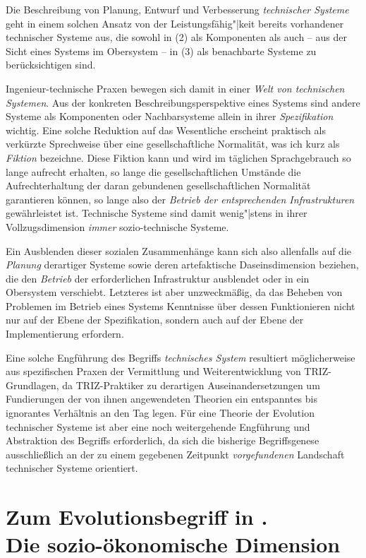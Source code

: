 \documentclass[11pt,a4paper]{article}
\begin{document}
Die Beschreibung von Planung, Entwurf und Verbesserung \emph{technischer
  Systeme} geht in einem solchen Ansatz von der Leistungsfähig"|keit bereits
vorhandener technischer Systeme aus, die sowohl in (2) als Komponenten als
auch -- aus der Sicht eines Systems im Obersystem -- in (3) als benachbarte
Systeme zu berücksichtigen sind.

Ingenieur-technische Praxen bewegen sich damit in einer \emph{Welt von
  technischen Systemen}. Aus der konkreten Beschreibungsperspektive eines
Systems sind andere Systeme als Komponenten oder Nachbarsysteme allein in
ihrer \emph{Spezifikation} wichtig. Eine solche Reduktion auf das Wesentliche
erscheint praktisch als verkürzte Sprechweise über eine gesellschaftliche
Normalität, was ich kurz als \emph{Fiktion} bezeichne.  Diese Fiktion kann und
wird im täglichen Sprachgebrauch so lange aufrecht erhalten, so lange die
gesellschaftlichen Umstände die Aufrechterhaltung der daran gebundenen
gesellschaftlichen Normalität garantieren können, so lange also der
\emph{Betrieb der entsprechenden Infrastrukturen} gewährleistet ist.
Technische Systeme sind damit wenig"|stens in ihrer Vollzugsdimension
\emph{immer} sozio-technische Systeme.

Ein Ausblenden dieser sozialen Zusammenhänge kann sich also allenfalls auf die
\emph{Planung} derartiger Systeme sowie deren artefaktische Daseinsdimension
beziehen, die den \emph{Betrieb} der erforderlichen Infrastruktur ausblendet
oder in ein Obersystem verschiebt.  Letzteres ist aber unzweckmäßig, da das
Beheben von Problemen im Betrieb eines Systems Kenntnisse über dessen
Funktionieren nicht nur auf der Ebene der Spezifikation, sondern auch auf der
Ebene der Implementierung erfordern.

Eine solche Engführung des Begriffs \emph{technisches System} resultiert
möglicherweise aus spezifischen Praxen der Vermittlung und Weiterentwicklung
von TRIZ-Grundlagen, da TRIZ-Praktiker zu derartigen Auseinandersetzungen um
Fundierungen der von ihnen angewendeten Theorien ein entspanntes bis
ignorantes Verhältnis an den Tag legen. Für eine Theorie der Evolution
technischer Systeme ist aber eine noch weitergehende Engführung und
Abstraktion des Begriffs erforderlich, da sich die bisherige Begriffsgenese
ausschließlich an der zu einem gegebenen Zeitpunkt \emph{vorgefundenen}
Landschaft technischer Systeme orientiert.

\section{Zum Evolutionsbegriff in \cite{TESE2018}.\\ Die sozio-ökonomische
  Dimension} 
\end{document}
